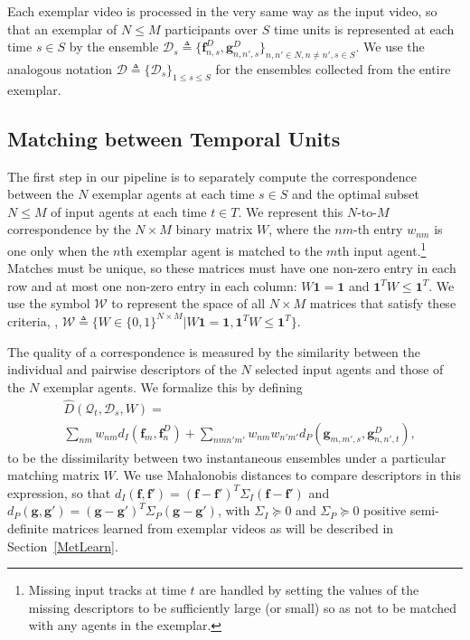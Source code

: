 Each exemplar video is processed in the very same way as the input video, so that an exemplar of $N\le M$ participants over $S$ time units is represented at each time $s\in S$ by the ensemble $\mathcal{D}_{s}\triangleq\{\mathbf{f}^{D}_{n,s},\mathbf{g}^{D}_{n,n',s}\}_{n,n'\in N, n\neq n', s\in S}$. We use the analogous notation $\mathcal{D}\triangleq\{\mathcal{D}_{s}\}_{1\leq s\leq S}$ for the ensembles collected from the entire exemplar. 

\subsection{Matching between Temporal Units}

\label{agg}

The first step in our pipeline is to separately compute the correspondence between the $N$ exemplar agents at each time $s\in S$ and the optimal subset $N\le M$ of input agents at each time $t\in T$. We represent this $N$-to-$M$ correspondence by the $N\times M$ binary matrix $W$, where the $nm$-th entry $w_{nm}$ is one only when the $n$th exemplar agent is matched to the $m$th input agent.\footnote{Missing input tracks at time $t$ are handled by setting the values of the missing descriptors to be sufficiently large (or small) so as not to be matched with any agents in the exemplar.} Matches must be unique, so these matrices must have one non-zero entry in each row and at most one non-zero entry in each column: $W\mathbf{1}=\mathbf{1}$ and $\mathbf{1}^{T}W\leq\mathbf{1}^{T}$. We use the symbol $\mathcal{W}$ to represent the space of all $N\times M$ matrices that satisfy these criteria, \ie, $\mathcal{W}\triangleq\{W\in\{0,1\}^{N\times M}| W\mathbf{1}=\mathbf{1}, \mathbf{1}^{T}W\leq\mathbf{1}^{T}\}$.

The quality of a correspondence is measured by the similarity between the individual and pairwise descriptors of the $N$ selected input agents and those of the $N$ exemplar agents. We formalize this by defining 
\begin{equation}
\begin{split}
&\hat{D}(\mathcal{Q}_{t}, \mathcal{D}_{s}, W)=\\
&\sum_{nm}w_{nm}d_{I}(\mathbf{f}_{m}, \mathbf{f}^{D}_{n})+\!\!\!\!\!\!\sum_{nmn'm'}\!\!\!\!\!w_{nm}w_{n'm'}d_{P}(\mathbf{g}_{m,m',s}, \mathbf{g}^{D}_{n,n',t}),
\end{split}
\end{equation}
to be the dissimilarity between two instantaneous ensembles under a particular matching matrix $W$. We use Mahalonobis distances to compare descriptors in this expression, so that $d_{I}(\mathbf{f}, \mathbf{f}')=(\mathbf{f}-\mathbf{f}')^{T}\Sigma_{I}(\mathbf{f}-\mathbf{f}')$ and $d_{P}(\mathbf{g}, \mathbf{g}')=(\mathbf{g}-\mathbf{g}')^{T}\Sigma_{P}(\mathbf{g}-\mathbf{g}')$, with $\Sigma_{I}\succeq 0$ and $\Sigma_{P}\succeq 0$ positive semi-definite matrices learned from exemplar videos as will be described in Section~\ref{MetLearn}.

